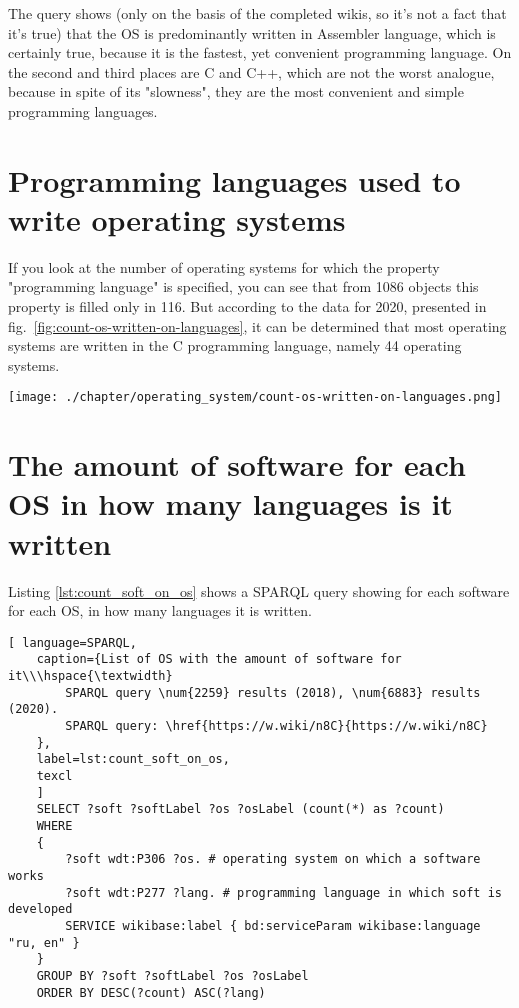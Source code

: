 The query shows (only on the basis of the completed wikis, so it's not a fact that it's true) that the OS is predominantly written in Assembler language, which is certainly true, because it is the fastest, yet convenient programming language. On the second and third places are C and C++, which are not the worst analogue, because in spite of its "slowness", they are the most convenient and simple programming languages.

\section{Programming languages used to write operating systems}
If you look at the number of operating systems for which the property "programming language" is specified, you can see that from \num{1086} objects this property is filled only in \num{116}. But according to the data for 2020, presented in fig.~\ref{fig:count-os-written-on-languages}, it can be determined that most operating systems are written in the C programming language, namely 44 operating systems.

\begin{figure*}[h!]
	\texttt{[image: ./chapter/operating\_system/count-os-written-on-languages.png]}
	\caption{Count of operating systems which written by programming language (2020).}
	\label{fig:count-os-written-on-languages}
\end{figure*}


\section{The amount of software for each OS in how many languages is it written}
Listing \ref{lst:count_soft_on_os} shows a SPARQL query showing for each software for each OS, in how many languages it is written.

\begin{lstlisting}[ language=SPARQL, 
	caption={List of OS with the amount of software for it\\\hspace{\textwidth}
		SPARQL query \num{2259} results (2018), \num{6883} results (2020).
		SPARQL query: \href{https://w.wiki/n8C}{https://w.wiki/n8C}
	},
	label=lst:count_soft_on_os,
	texcl 
	]
	SELECT ?soft ?softLabel ?os ?osLabel (count(*) as ?count)
	WHERE
	{
		?soft wdt:P306 ?os. # operating system on which a software works
		?soft wdt:P277 ?lang. # programming language in which soft is developed
		SERVICE wikibase:label { bd:serviceParam wikibase:language "ru, en" }
	}
	GROUP BY ?soft ?softLabel ?os ?osLabel
	ORDER BY DESC(?count) ASC(?lang)
\end{lstlisting}


